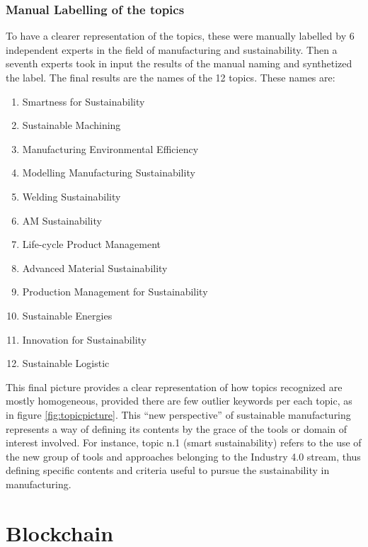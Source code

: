 \documentclass[]{book}
\providecommand{\tightlist}{%
  \setlength{\itemsep}{0pt}\setlength{\parskip}{0pt}}
\begin{document}
\subsubsection*{Manual Labelling of the
topics}\label{manual-labelling-of-the-topics}

To have a clearer representation of the topics, these were manually
labelled by 6 independent experts in the field of manufacturing and
sustainability. Then a seventh experts took in input the results of the
manual naming and synthetized the label. The final results are the names
of the 12 topics. These names are:

\begin{enumerate}
\def\labelenumi{\arabic{enumi}.}
\tightlist
\item
  Smartness for Sustainability
\item
  Sustainable Machining
\item
  Manufacturing Environmental Efficiency
\item
  Modelling Manufacturing Sustainability
\item
  Welding Sustainability
\item
  AM Sustainability
\item
  Life-cycle Product Management
\item
  Advanced Material Sustainability
\item
  Production Management for Sustainability
\item
  Sustainable Energies
\item
  Innovation for Sustainability
\item
  Sustainable Logistic
\end{enumerate}

This final picture provides a clear representation of how topics
recognized are mostly homogeneous, provided there are few outlier
keywords per each topic, as in figure \ref{fig:topicpicture}. This ``new
perspective'' of sustainable manufacturing represents a way of defining
its contents by the grace of the tools or domain of interest involved.
For instance, topic n.1 (smart sustainability) refers to the use of the
new group of tools and approaches belonging to the Industry 4.0 stream,
thus defining specific contents and criteria useful to pursue the
sustainability in manufacturing.

\section{Blockchain}\label{blockchain}
\end{document}
